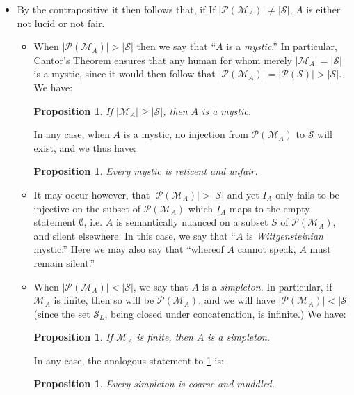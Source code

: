 \documentclass[12pt]{article}
\newtheorem{prop}[thm]{Proposition}
\begin{document}
\begin{itemize}
\item By the contrapositive it then follows that, if If $|\mathcal{P}(\mathcal{M}_A)|\neq |\mathcal{S}|$, $A$ is either not lucid or not fair.
\begin{itemize}
\item When $|\mathcal{P}(\mathcal{M}_A)|>|\mathcal{S}|$ then we say that ``$A$ is a \textit{mystic}.''  In particular, Cantor's Theorem ensures that any human for whom merely $|\mathcal{M}_A|=|\mathcal{S}|$ is a mystic, since it would then follow that $|\mathcal{P}(\mathcal{M}_A)|=|\mathcal{P}(\mathcal{S})|>|\mathcal{S}|$.  We have:
\begin{prop}\label{geqmystics}
If $|\mathcal{M}_A|\geq|\mathcal{S}|$, then $A$ is a mystic.
\end{prop}

In any case, when $A$ is a mystic, no injection from $\mathcal{P}(\mathcal{M}_A)$ to $\mathcal{S}$ will exist, and we thus have:
\begin{prop}\label{mystics}
Every mystic is reticent and unfair.
\end{prop}
\item It may occur however, that $|\mathcal{P}(\mathcal{M}_A)|>|\mathcal{S}|$ and yet $I_A$ only fails to be injective on the subset of $\mathcal{P}(\mathcal{M}_A)$ which $I_A$ maps to the empty statement $\emptyset$, i.e. $A$ is semantically nuanced on a subset $S$ of $\mathcal{P}(\mathcal{M}_A)$, and silent elsewhere.  In this case, we say that ``$A$ is \textit{Wittgensteinian} mystic.''  Here we may also say that ``whereof $A$ cannot speak, $A$ must remain silent.''
\item When $|\mathcal{P}(\mathcal{M}_A)|<|\mathcal{S}|$, we say that $A$ is a \textit{simpleton}.  In particular, if $\mathcal{M}_A$ is finite, then so will be $\mathcal{P}(\mathcal{M}_A)$, and we will have $|\mathcal{P}(\mathcal{M}_A)|<|\mathcal{S}|$ (since the set $\mathcal{S}_L$, being closed under concatenation, is infinite.)  We have:
\begin{prop}\label{finitesimpletons}
If $\mathcal{M}_A$ is finite, then $A$ is a simpleton.
\end{prop}
In any case, the analogous statement to \ref{mystics} is:
\begin{prop}\label{simpletons}
Every simpleton is coarse and muddled.
\end{prop}
\end{itemize}
\end{itemize}
\end{document}
